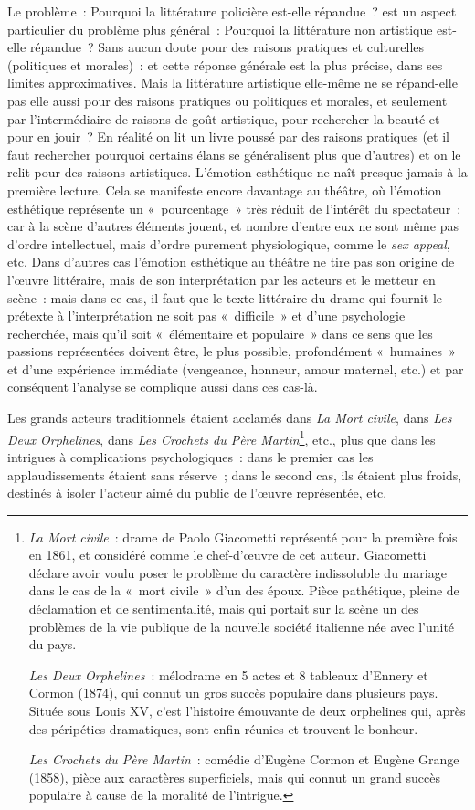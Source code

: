 \documentclass[french,twoside]{book} %
\begin{document}
Le problème : Pourquoi la littérature policière est-elle répandue ? est un aspect particulier du problème plus général : Pourquoi la littérature non artistique est-elle répandue ? Sans aucun doute pour des raisons pratiques et culturelles (politiques et morales) : et cette réponse générale est la plus précise, dans ses limites approximatives. Mais la littérature artistique elle-même ne se répand-elle pas elle aussi pour des raisons pratiques ou politiques et morales, et seulement par l’intermédiaire de raisons de goût artistique, pour rechercher la beauté et pour en jouir ? En réalité on lit un livre poussé par des raisons pratiques (et il faut rechercher pourquoi certains élans se généralisent plus que d’autres) et on le relit pour des raisons artistiques. L'émotion esthétique ne naît presque jamais à la première lecture. Cela se manifeste encore davantage au théâtre, où l’émotion esthétique représente un « pourcentage » très réduit de l’intérêt du spectateur ; car à la scène d’autres éléments jouent, et nombre d’entre eux ne sont même pas d’ordre intellectuel, mais d’ordre purement physiologique, comme le \emph{sex appeal}, etc. Dans d’autres cas l’émotion esthétique au théâtre ne tire pas son origine de l’œuvre littéraire, mais de son interprétation par les acteurs et le metteur en scène : mais dans ce cas, il faut que le texte littéraire du drame qui fournit le prétexte à l’interprétation ne soit pas « difficile » et d’une psychologie recherchée, mais qu’il soit « élémentaire et populaire » dans ce sens que les passions représentées doivent être, le plus possible, profondément « humaines » et d’une expérience immédiate (vengeance, honneur, amour maternel, etc.) et par conséquent l’analyse se complique aussi dans ces cas-là.\par
Les grands acteurs traditionnels étaient acclamés dans \emph{La Mort civile}, dans \emph{Les Deux Orphelines}, dans \emph{Les Crochets du Père Martin}\footnote{ \noindent \emph{La Mort civile} : drame de Paolo Giacometti représenté pour la première fois en 1861, et considéré comme le chef-d’œuvre de cet auteur. Giacometti déclare avoir voulu poser le problème du caractère indissoluble du mariage dans le cas de la « mort civile » d’un des époux. Pièce pathétique, pleine de déclamation et de sentimentalité, mais qui portait sur la scène un des problèmes de la vie publique de la nouvelle société italienne née avec l’unité du pays.\par
 \emph{Les Deux Orphelines} : mélodrame en 5 actes et 8 tableaux d’Ennery et Cormon (1874), qui connut un gros succès populaire dans plusieurs pays. Située sous Louis XV, c’est l’histoire émouvante de deux orphelines qui, après des péripéties dramatiques, sont enfin réunies et trouvent le bonheur.\par
 \emph{Les Crochets du Père Martin} : comédie d’Eugène Cormon et Eugène Grange (1858), pièce aux caractères superficiels, mais qui connut un grand succès populaire à cause de la moralité de l’intrigue.
}, etc., plus que dans les intrigues à complications psychologiques : dans le premier cas les applaudissements étaient sans réserve ; dans le second cas, ils étaient plus froids, destinés à isoler l’acteur aimé du public de l’œuvre représentée, etc.\par
\end{document}
